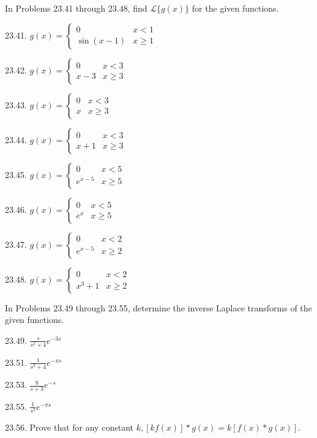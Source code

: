 \documentclass[10pt]{article}
\begin{document}
In Problems 23.41 through 23.48, find $\mathscr{L}\{g(x)\}$ for the given functions.

23.41. $g(x)=\left\{\begin{array}{cc}0 & x<1 \\ \sin (x-1) & x \geq 1\end{array}\right.$

23.42. $g(x)=\left\{\begin{array}{cc}0 & x<3 \\ x-3 & x \geq 3\end{array}\right.$

23.43. $g(x)= \begin{cases}0 & x<3 \\ x & x \geq 3\end{cases}$

23.44. $g(x)=\left\{\begin{array}{cc}0 & x<3 \\ x+1 & x \geq 3\end{array}\right.$

23.45. $g(x)=\left\{\begin{array}{cc}0 & x<5 \\ e^{x-5} & x \geq 5\end{array}\right.$

23.46. $g(x)=\left\{\begin{array}{cc}0 & x<5 \\ e^{x} & x \geq 5\end{array}\right.$

23.47. $g(x)=\left\{\begin{array}{cc}0 & x<2 \\ e^{x-5} & x \geq 2\end{array}\right.$

23.48. $g(x)=\left\{\begin{array}{cc}0 & x<2 \\ x^{3}+1 & x \geq 2\end{array}\right.$

In Problems 23.49 through 23.55, determine the inverse Laplace transforms of the given functions.

23.49. $\frac{s}{s^{2}+4} e^{-3 s}$

23.51. $\frac{1}{s^{2}+4} e^{-\pi s}$

23.53. $\frac{8}{s+3} e^{-s}$

23.55. $\frac{1}{s^{2}} e^{-\pi s}$

23.56. Prove that for any constant $k,[k f(x)] * g(x)=k[f(x) * g(x)]$.
\end{document}
